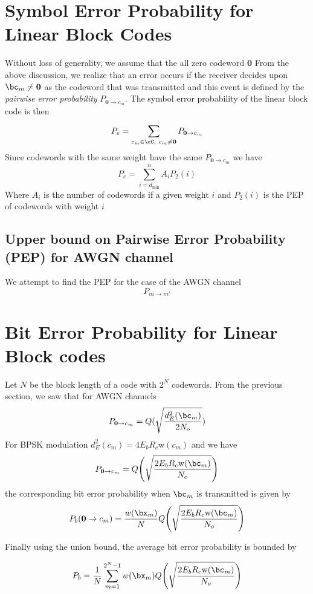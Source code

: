 \documentclass[11pt, oneside, dvipdfmx]{book}
\begin{document}
\section{Symbol Error Probability for Linear Block Codes}
Without loss of generality, we assume that the all zero codeword $\mathbf{0}$
From the above discussion, we realize that an error occurs if the receiver decides upon $\bc_m \neq \mathbf{0} $ as the codeword that was transmitted and this event is defined by the \textit{pairwise error probability} $P_{\mathbf{0} \rightarrow c_m}$. The symbol error probability of the linear block code is then 
\begin{equation}
P_e = \sum_{c_m \in \cC,~c_{m} \neq \mathbf{0}}^{} P_{\mathbf{0} \rightarrow c_m}
\end{equation}
Since codewords with the same weight have the same $P_{\mathbf{0} \rightarrow c_m}$ we have 
\begin{equation}
P_e = \sum_{i=d_{\text{min}}}^{n} A_iP_{2}(i)
\end{equation}
Where $A_i$ is the number of codewords if a given weight $i$ and $P_2(i)$ is the PEP of codewords with weight $i$ 

\subsection{Upper bound on Pairwise Error Probability (PEP) for AWGN channel}
We attempt to find the PEP for the case of the AWGN channel  
\begin{equation}
P_{m \rightarrow m'}
\end{equation}

\section{Bit Error Probability for Linear Block codes}
Let $N$ be the block length of a code with $2^N$ codewords. 
From the previous section, we saw that for AWGN channels 
\begin{equation}
 P_{\mathbf{0} \rightarrow c_m} = Q(\sqrt{\frac{d^2_E(\bc_m)}{2N_o}})
 \label{pepAWGN}
\end{equation}
For BPSK modulation $d^2_E(c_m) = 4E_bR_c\text{w}(c_m)$ and we have 
\begin{equation}
 P_{\mathbf{0} \rightarrow c_m} = Q\Bigg(\sqrt{\frac{2E_bR_c\text{w}(\bc_m)}{N_o}}\Bigg)
 \label{pepBPSK}
\end{equation}
the corresponding bit error probability when $\bc_m$ is transmitted is given by 
\begin{equation}
P_b(\mathbf{0}\rightarrow c_m) =\frac{w(\bx_m)}{N} Q\Bigg(\sqrt{\frac{2E_bR_c\text{w}(\bc_m)}{N_o}}\Bigg)
\end{equation}

Finally using the union bound, the average bit error probability is bounded by

\begin{equation}
P_b = \frac{1}{N} \sum_{m=1}^{2^{N}-1} w(\bx_m)Q\Bigg(\sqrt{\frac{2E_bR_c\text{w}(\bc_m)}{N_o}}\Bigg)
\end{equation}
\end{document}
